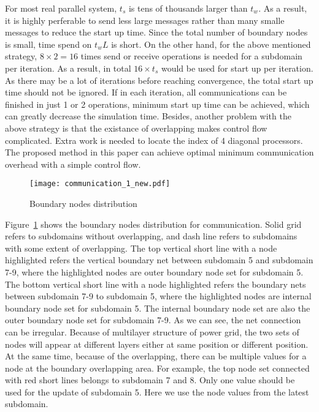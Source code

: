 \documentclass{sig-alternate}
\begin{document}
	For most real parallel system, $t_s$ is tens of thousands larger than $t_w$. As a result, it is highly perferable to send less 
	large messages rather than many smalle messages to reduce the start up time. Since the total number of boundary nodes is small, 
	time spend on $t_wL$ is short. On the other hand, for the above mentioned strategy, $8\times 2 = 
	16$ times send or receive operations is needed for a subdomain per iteration. As a result, in total $16\times t_s$ would be used 
	for start up per iteration. As there may be a lot of iterations before reaching convergence, the total start up time
	should not be ignored. If in each iteration, all communications can be finished in just 1 or 2 operations, minimum start up time 
	can be achieved, which can greatly decrease the simulation time.
	Besides, another problem with the above strategy is that the existance of overlapping makes control flow complicated. Extra work 
	is needed to locate the index of 4 diagonal processors. The proposed method in this paper can achieve optimal minimum 
	communication overhead with a simple control flow.\\

	\begin{figure}[htbp]
	  \centering
	  \texttt{[image: communication\_1\_new.pdf]}
	  \caption{Boundary nodes distribution}
	  \label{comm}
	\end{figure}

	Figure~\ref{comm} shows the boundary nodes distribution for communication. Solid grid refers to subdomains without overlapping, 
	and dash line refers to subdomains with some extent of overlapping. The
	top vertical short line with a node highlighted refers the vertical boundary net between subdomain 5 and subdomain 7-9, where the
	highlighted nodes are outer boundary node set for subdomain 5. The bottom 
	vertical short line with a node highlighted refers the boundary nets between subdomain 7-9 to subdomain 5, where the highlighted 
	nodes are internal boundary node set for subdomain 5. The internal boundary node set are also the outer boundary node set for 
	subdomain 7-9. As we can see, the net connection can be irregular. Because of multilayer structure of
	power grid, the two sets of nodes will appear at different layers either at same position or different position. At the
	same time, because of the overlapping, there can be multiple values for a node at the boundary overlapping area. For example, 
	the top node set connected with red short lines belongs to subdomain 7 and 8. Only one value should be used for the update of 
	subdomain 5. Here we use the node values from the latest subdomain.\\
\end{document}
